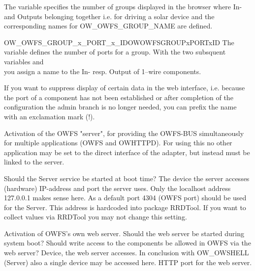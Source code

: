 \begin{description}
The variable  specifies the number of groups
displayed in the browser where In- and Outputs belonging together i.e.
for driving a solar device and the corresponding names for
OW\_OWFS\_GROUP\_NAME are defined.

	{OW\_OWFS\_GROUP\_x\_PORT\_x\_ID}{OWOWFSGROUPxPORTxID}
The variable  defines the number of ports
for a group. With the two subsquent variables  and \\
 you assign a name to the In-
resp. Output of 1--wire components.

If you want to suppress display of certain data in the web interface, i.e. because
the port of a component has not been established or after completion of the
configuration the admin branch is no longer needed, you can prefix the name with
an exclamation mark (!).

Activation of the OWFS "server", for providing the OWFS-BUS simultaneously
for multiple applications (OWFS and OWHTTPD). For using this no other application
may be set to the direct interface of the adapter, but instead must be linked to
the server.

Should  the Server service be started at boot time?
The device the server accesses (hardware)
IP-address and port the server uses.
Only the localhost address 127.0.0.1 makes sense here.
As a default port 4304 (OWFS port) should be used for the Server.
This address is hardcoded into package RRDTool. If you want to collect
values via RRDTool you may not change this setting.

Activation of OWFS's own web server.
Should the web server be started during system boot?
Should write access to the components be allowed in OWFS via the web server?
Device, the web server accesses. In conclusion with OW\_OWSHELL (Server) also
a single device may be accessed here.
HTTP port for the web server.


\end{description}
